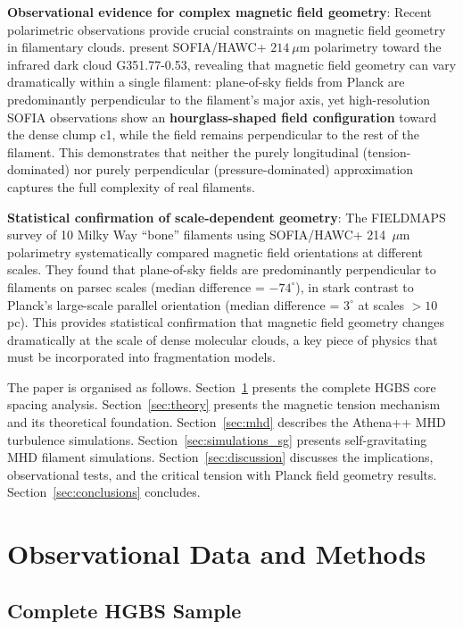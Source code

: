 \documentclass[11pt,a4paper]{article}
\begin{document}
\textbf{Observational evidence for complex magnetic field geometry}: Recent polarimetric observations provide crucial constraints on magnetic field geometry in filamentary clouds. \citet{Jadhav2026} present SOFIA/HAWC+ $214~\mu$m polarimetry toward the infrared dark cloud G351.77-0.53, revealing that magnetic field geometry can vary dramatically within a single filament: plane-of-sky fields from Planck are predominantly perpendicular to the filament's major axis, yet high-resolution SOFIA observations show an \textbf{hourglass-shaped field configuration} toward the dense clump c1, while the field remains perpendicular to the rest of the filament. This demonstrates that neither the purely longitudinal (tension-dominated) nor purely perpendicular (pressure-dominated) approximation captures the full complexity of real filaments.

\textbf{Statistical confirmation of scale-dependent geometry}: The FIELDMAPS survey of 10 Milky Way ``bone'' filaments \citep{Coude2025} using SOFIA/HAWC+ 214~$\mu$m polarimetry systematically compared magnetic field orientations at different scales. They found that plane-of-sky fields are predominantly perpendicular to filaments on parsec scales (median difference = $-74^{\circ}$), in stark contrast to Planck's large-scale parallel orientation (median difference = $3^{\circ}$ at scales $>10$ pc). This provides statistical confirmation that magnetic field geometry changes dramatically at the scale of dense molecular clouds, a key piece of physics that must be incorporated into fragmentation models.

The paper is organised as follows. Section~\ref{sec:observations} presents the complete HGBS core spacing analysis. Section~\ref{sec:theory} presents the magnetic tension mechanism and its theoretical foundation. Section~\ref{sec:mhd} describes the Athena++ MHD turbulence simulations. Section~\ref{sec:simulations_sg} presents self-gravitating MHD filament simulations. Section~\ref{sec:discussion} discusses the implications, observational tests, and the critical tension with Planck field geometry results. Section~\ref{sec:conclusions} concludes.

\section{Observational Data and Methods}
\label{sec:observations}

\subsection{Complete HGBS Sample}
\end{document}
